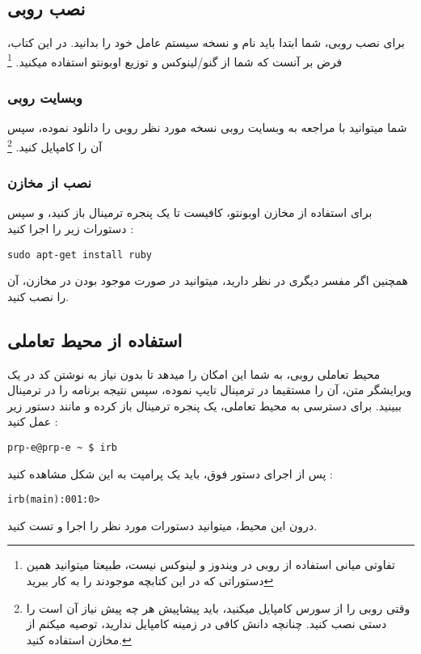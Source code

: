 \documentclass[11pt]{article}
\begin{document}
\subsection{نصب روبی}
برای نصب روبی، شما ابتدا باید نام و نسخه سیستم عامل خود را بدانید. در این کتاب، فرض بر آنست که شما از گنو/لینوکس و توزیع اوبونتو استفاده میکنید.
\footnote{تفاوتی میانی استفاده از روبی در ویندوز و لینوکس نیست، طبیعتا میتوانید همین دستوراتی که در این کتابچه موجودند را به کار ببرید}
\subsubsection{وبسایت روبی}
شما میتوانید با مراجعه به وبسایت روبی 
نسخه مورد نظر روبی را دانلود نموده، سپس آن را کامپایل کنید.
\footnote{وقتی روبی را از سورس کامپایل میکنید، باید پیشاپیش هر چه پیش نیاز آن است را دستی نصب کنید. چنانچه دانش کافی در زمینه کامپایل ندارید، توصیه میکنم از مخازن استفاده کنید.}
\subsubsection{نصب از مخازن}
برای استفاده از مخازن اوبونتو، کافیست تا یک پنجره ترمینال باز کنید، و سپس دستورات زیر را اجرا کنید :
\begin{latin}
\begin{verbatim}
sudo apt-get install ruby
\end{verbatim}
\end{latin}
همچنین اگر مفسر
دیگری در نظر دارید، میتوانید در صورت موجود بودن در مخازن، آن را نصب کنید. 
\subsection{استفاده از محیط تعاملی}
محیط تعاملی
روبی، به شما این امکان را میدهد تا بدون نیاز به نوشتن کد در یک ویرایشگر متن، آن را مستقیما در ترمینال تایپ نموده، سپس نتیجه برنامه را در ترمینال ببینید. برای دسترسی به محیط تعاملی، یک پنجره ترمینال باز کرده و مانند دستور زیر عمل کنید :
\begin{latin}
\begin{verbatim}
prp-e@prp-e ~ $ irb
\end{verbatim}
\end{latin}
پس از اجرای دستور فوق، باید یک پرامپت
به این شکل مشاهده کنید :
\begin{latin}
\begin{verbatim}
irb(main):001:0> 
\end{verbatim}
\end{latin}
درون این محیط، میتوانید دستورات مورد نظر را اجرا و تست کنید. 
\end{document}
